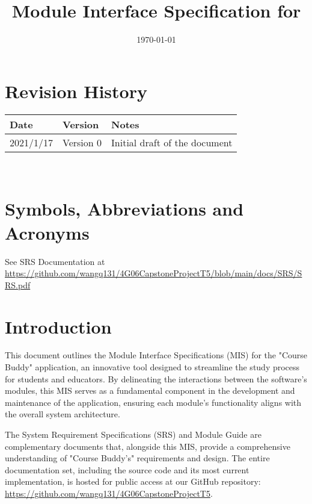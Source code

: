 \documentclass[12pt, titlepage]{article}
\begin{document}
\title{Module Interface Specification for \progname{}}

\author{\authname}

\date{\today}

\maketitle


\section{Revision History}

\begin{tabularx}{\textwidth}{p{3cm}p{2cm}X}
\toprule {\bf Date} & {\bf Version} & {\bf Notes}\\
\midrule
2021/1/17 & Version 0  & Initial draft of the document\\
\bottomrule
\end{tabularx}

~\newpage

\section{Symbols, Abbreviations and Acronyms}

See SRS Documentation at \url{https://github.com/wangq131/4G06CapstoneProjectT5/blob/main/docs/SRS/SRS.pdf}


\newpage

\tableofcontents

\newpage


\section{Introduction}
This document outlines the Module Interface Specifications (MIS) for the "Course Buddy" application, an innovative tool designed to streamline the study process for students and educators. By delineating the interactions between the software's modules, this MIS serves as a fundamental component in the development and maintenance of the application, ensuring each module's functionality aligns with the overall system architecture.

The System Requirement Specifications (SRS) and Module Guide are complementary documents that, alongside this MIS, provide a comprehensive understanding of "Course Buddy's" requirements and design. The entire documentation set, including the source code and its most current implementation, is hosted for public access at our GitHub repository: \url{https://github.com/wangq131/4G06CapstoneProjectT5}.
\end{document}
